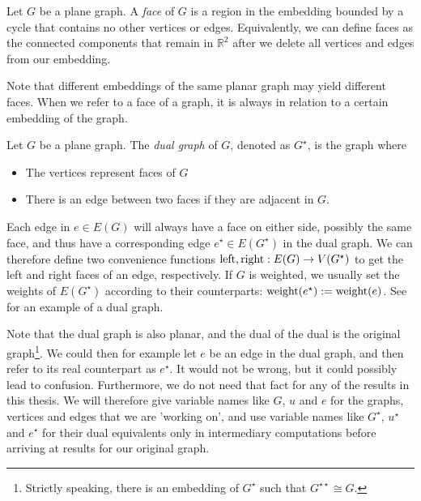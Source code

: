 \begin{definition}[Face]
    Let $G$ be a plane graph. A \emph{face} of $G$ is a region in the embedding bounded by a cycle that contains no other vertices or edges. Equivalently, we can define faces as the connected components that remain in $\mathbb{R}^2$ after we delete all vertices and edges from our embedding. 

    Note that different embeddings of the same planar graph may yield different faces. When we refer to a face of a graph, it is always in relation to a certain embedding of the graph.
\end{definition}

\begin{definition}
    Let $G$ be a plane graph. The \emph{dual graph} of $G$, denoted as $G^\star$, is the graph where 
    \begin{itemize}
        \item The vertices represent faces of $G$
        \item There is an edge between two faces if they are adjacent in $G$.
    \end{itemize}
\end{definition}

Each edge in $e \in E(G)$ will always have a face on either side, possibly the same face, and thus have a corresponding edge $e^\star \in E(G^\star)$ in the dual graph. We can therefore define two convenience functions $\operatorname{left}, \operatorname{right} : E(G) \rightarrow V(G^\star)$ to get the left and right faces of an edge, respectively. If $G$ is weighted, we usually set the weights of $E(G^\star)$ according to their counterparts: $\operatorname{weight}(e^\star) := \operatorname{weight}(e)$. See  for an example of a dual graph.

Note that the dual graph is also planar, and the dual of the dual is the original graph\footnote{Strictly speaking, there is an embedding of $G^\star$ such that $G^{\star\star} \cong G$.}. We could then for example let $e$ be an edge in the dual graph, and then refer to its real counterpart as $e^\star$. It would not be wrong, but it could possibly lead to confusion. Furthermore, we do not need that fact for any of the results in this thesis. We will therefore give variable names like $G$, $u$ and $e$ for the graphs, vertices and edges that we are 'working on', and use variable names like $G^\star$, $u^\star$ and $e^\star$ for their dual equivalents only in intermediary computations before arriving at results for our original graph.

